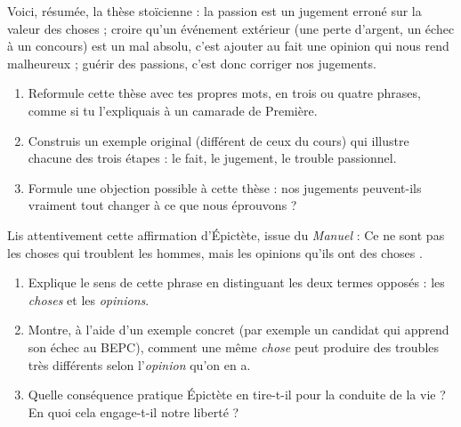 \documentclass[11pt]{article}
\newcounter{popsec}
\newcounter{popsub}
\newcommand{\courssub}[1]{%
  \stepcounter{popsub}%
  \par\vspace{9pt}\noindent{\popxbold\fontsize{11.5}{13}\selectfont\color{popink}{\color{poporange}\thepopsec.\thepopsub}\hspace{6pt}#1}\par\nopagebreak\vspace{4pt}
}
\begin{document}
\courssub{Je m'entraîne}

\begin{exercice}
Voici, résumée, la thèse stoïcienne : la passion est un jugement erroné sur la valeur des choses ; croire qu'un événement extérieur (une perte d'argent, un échec à un concours) est un mal absolu, c'est ajouter au fait une opinion qui nous rend malheureux ; guérir des passions, c'est donc corriger nos jugements.

\begin{enumerate}
\item Reformule cette thèse avec tes propres mots, en trois ou quatre phrases, comme si tu l'expliquais à un camarade de Première.
\item Construis un exemple original (différent de ceux du cours) qui illustre chacune des trois étapes : le fait, le jugement, le trouble passionnel.
\item Formule une objection possible à cette thèse : nos jugements peuvent-ils vraiment tout changer à ce que nous éprouvons ?
\end{enumerate}
\end{exercice}

\begin{exercice}
Lis attentivement cette affirmation d'Épictète, issue du \emph{Manuel} : \guillemotleft Ce ne sont pas les choses qui troublent les hommes, mais les opinions qu'ils ont des choses \guillemotright.

\begin{enumerate}
\item Explique le sens de cette phrase en distinguant les deux termes opposés : les \emph{choses} et les \emph{opinions}.
\item Montre, à l'aide d'un exemple concret (par exemple un candidat qui apprend son échec au BEPC), comment une même \emph{chose} peut produire des troubles très différents selon l'\emph{opinion} qu'on en a.
\item Quelle conséquence pratique Épictète en tire-t-il pour la conduite de la vie ? En quoi cela engage-t-il notre liberté ?
\end{enumerate}
\end{exercice}
\end{document}
